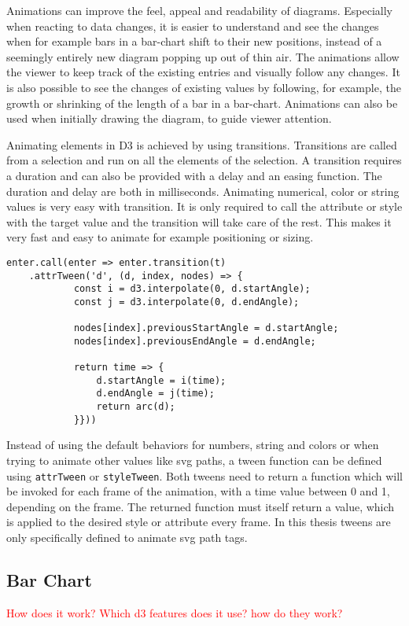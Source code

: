 Animations can improve the feel, appeal and readability of diagrams. Especially when reacting to data changes, it is easier to understand and see the changes when for example bars in a bar-chart shift to their new positions, instead of a seemingly entirely new diagram popping up out of thin air. The animations allow the viewer to keep track of the existing entries and visually follow any changes. It is also possible to see the changes of existing values by following, for example, the growth or shrinking of the length of a bar in a bar-chart. Animations can also be used when initially drawing the diagram, to guide viewer attention.

Animating elements in D3 is achieved by using transitions. Transitions are called from a selection and run on all the elements of the selection. A transition requires a duration and can also be provided with a delay and an easing function. The duration and delay are both in milliseconds. Animating numerical, color or string values is very easy with transition. It is only required to call the attribute or style with the target value and the transition will take care of the rest. This makes it very fast and easy to animate for example positioning or sizing.

\begin{lstlisting}[style=htmlcssjs]
    enter.call(enter => enter.transition(t)
    .attrTween('d', (d, index, nodes) => {
            const i = d3.interpolate(0, d.startAngle);
            const j = d3.interpolate(0, d.endAngle);

            nodes[index].previousStartAngle = d.startAngle;
            nodes[index].previousEndAngle = d.endAngle;

            return time => {
                d.startAngle = i(time);
                d.endAngle = j(time);
                return arc(d);
            }}))
\end{lstlisting}

Instead of using the default behaviors for numbers, string and colors or when trying to animate other values like svg paths, a tween function can be defined using \verb|attrTween| or \verb|styleTween|. Both tweens need to return a function which will be invoked for each frame of the animation, with a time value between 0 and 1, depending on the frame. The returned function must itself return a value, which is applied to the desired style or attribute every frame. In this thesis tweens are only specifically defined to animate svg path tags.


\subsection{Bar Chart}
\textcolor{red}{
How does it work? Which d3 features does it use? how do they work?}

